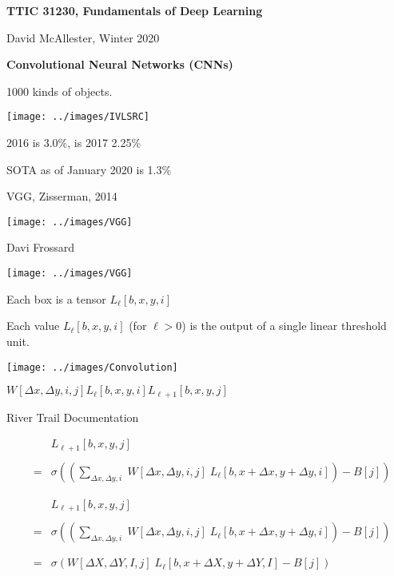 




{\Huge

  \centerline{\bf TTIC 31230, Fundamentals of Deep Learning}
  \bigskip
  \centerline{David McAllester, Winter 2020}

    \vfill
  \centerline{\bf Convolutional Neural Networks (CNNs)}
  \vfill
  \vfill



1000 kinds of objects.

\vfill
\centerline{\texttt{[image: ../images/IVLSRC]}}
2016 is 3.0\%, is 2017 2.25\%

\medskip
SOTA as of January 2020 is 1.3\%

{VGG, Zisserman, 2014}

\centerline{\texttt{[image: ../images/VGG]}}
\centerline{\large Davi Frossard}


\centerline{\texttt{[image: ../images/VGG]}}

\vfill
Each box is a tensor $L_\ell[b,x,y,i]$

\vfill
Each value $L_\ell[b,x,y,i]$ (for $\ell > 0$) is the output of a single linear threshold unit.


\centerline{\texttt{[image: ../images/Convolution]}}
\centerline{$W[\Delta x,\Delta y,i,j]$\hspace{6ex}$L_{{\ell}}[b,x,y,i]$\hspace{6ex}$L_{{\ell+1}}[b,x,y,j]$}
\centerline{\large River Trail Documentation}

\vfill
\begin{eqnarray*}
 & &  L_{{\ell+1}}[b,x,y,j] \\
 \\
 & = &   \sigma\left(\left(\sum_{\Delta x, \Delta y, i}\;W[\Delta x, \Delta y, i,j]\; L_{{\ell}}[b,x + \Delta x, y + \Delta y, i]\right) - B[j]\right)\end{eqnarray*}


\begin{eqnarray*}
 & &  L_{{\ell+1}}[b,x,y,j] \\
 \\
 & = &   \sigma\left(\left(\sum_{\Delta x, \Delta y, i}\;W[\Delta x, \Delta y, i,j]\; L_{{\ell}}[b,x + \Delta x, y + \Delta y, i]\right) - B[j]\right) \\
 \\
 \\
  & = &   \sigma\left(W[\Delta X, \Delta Y, I,j]\; L_{{\ell}}[b,x + \Delta X, y + \Delta Y, I] - B[j]\right)
\end{eqnarray*}

}
